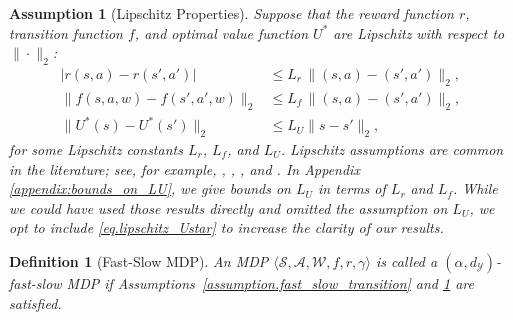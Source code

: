 \documentclass[11pt, notitlepage]{article}
\newcommand{\1}{\mathbbm{1}}
\newtheorem{assumption}{Assumption}
\newtheorem{definition}{Definition}
\begin{document}
\begin{assumption}[Lipschitz Properties]
\label{assumption:lipschitz}
Suppose that the reward function $r$, transition function $f$, and optimal value function $U^*$ are Lipschitz with respect to $\| \cdot \|_2$:
\begin{align}
|r(s,a) - r(s',a')| &\le L_r \,\bigl \|(s,a) - (s',a') \bigr\|_2, \label{assumption.lipschitz_reward}\\
 \bigl \|f(s,a,w) - f(s',a',w)\bigr\|_2 &\le L_f \,\bigl \|(s,a) - (s',a') \bigr\|_2\label{eq.lipschitz_f},\\
  \bigl \|U^*(s) - U^*(s') \bigl\|_2 &\le L_U \bigl \|s-s'\bigr\|_2\label{eq.lipschitz_Ustar},
\end{align}
for some Lipschitz constants $L_r$, $L_f$, and $L_U$. Lipschitz assumptions are common in the literature; see, for example, \cite{ok2018exploration}, \cite{domingues2021kernel}, \cite{sinclair2020adaptive}, and \cite{sinclair2022adaptive}. In Appendix \ref{appendix:bounds_on_LU}, we give bounds on $L_U$ in terms of $L_r$ and $L_f$. While we could have used those results directly and omitted the assumption on $L_U$, we opt to include \eqref{eq.lipschitz_Ustar} to increase the clarity of our results.
\end{assumption}


\begin{definition}[Fast-Slow MDP]
An MDP $\langle \mathcal{S}, \mathcal{A}, \mathcal{W}, f, r, \gamma \rangle$ is called a $(\alpha, d_\mathcal{Y})$-fast-slow MDP if Assumptions~\ref{assumption.fast_slow_transition} and \ref{assumption:lipschitz} are satisfied. 
\end{definition}
\end{document}
